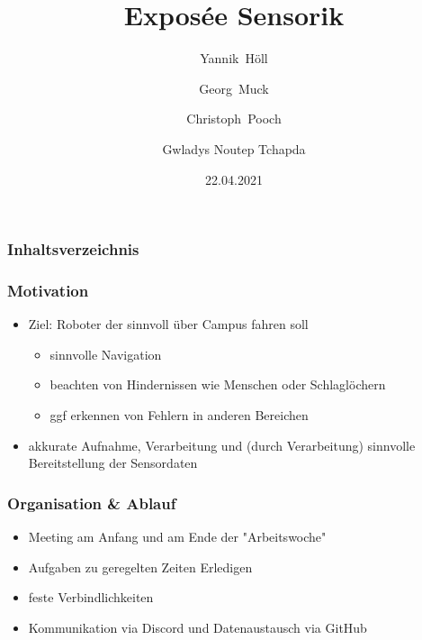 \documentclass{beamer}
\title{Exposée Sensorik}
\author[Y. Höll, G. Muck, C. Pooch, G. N. Tchapda]
	{Yannik~Höll \\ \and Georg~Muck \\ \and Christoph~Pooch \\ \and  Gwladys Noutep Tchapda}
\date{22.04.2021}
\begin{document}
	\frame{\titlepage}

\begin{frame}
	\frametitle{Inhaltsverzeichnis}
	\tableofcontents
\end{frame}


\begin{frame}
\frametitle{Motivation}
\begin{itemize}
\item<1-> Ziel: Roboter der sinnvoll über Campus fahren soll
\begin{itemize}
\item<2-4> sinnvolle Navigation
\item<3-4> beachten von Hindernissen wie Menschen oder Schlaglöchern
\item<4> ggf erkennen von Fehlern in anderen Bereichen
\end{itemize}

\item<5-> akkurate \alert<6->{Aufnahme}, \alert<7->{Verarbeitung} und (durch \alert<7->{Verarbeitung}) sinnvolle \alert<8->{Bereitstellung} der Sensordaten
\end{itemize}
\end{frame}

 \begin{frame}
\frametitle{ Organisation \& Ablauf}
\begin{itemize}
\item<1-> \alert{Meeting} am Anfang und am Ende der "Arbeitswoche"
\item<2-> Aufgaben zu geregelten Zeiten Erledigen
\item<3-> feste \alert{Verbindlichkeiten}
\item<4-> Kommunikation via \alert{Discord} und Datenaustausch via \alert{GitHub}
\end{itemize}
\end{frame}
\end{document}
